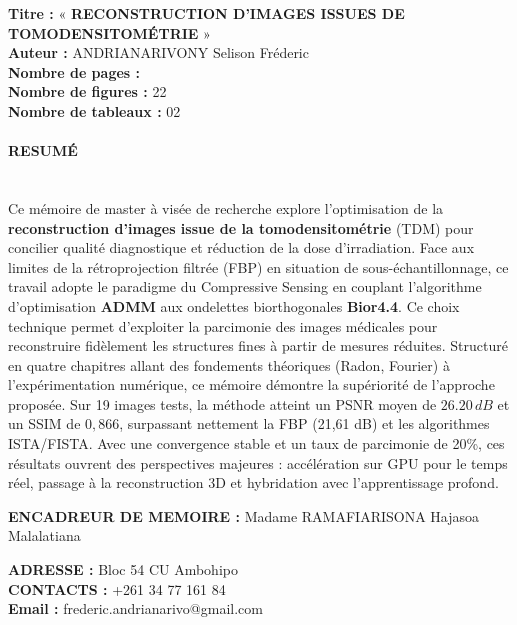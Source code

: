 \noindent
{\Large \textbf{Titre :} « \textbf{RECONSTRUCTION D'IMAGES ISSUES DE TOMODENSITOMÉTRIE} » }\vspace{0.5cm}\\
\textbf{Auteur :} ANDRIANARIVONY Selison Fréderic \\
\textbf{Nombre de pages :} \pageref{LastPage}\\
\textbf{Nombre de figures :} 22 \\
\textbf{Nombre de tableaux :} 02
\vspace{0.5cm}

\noindent
\paragraph{RESUMÉ} \\
Ce mémoire de master à visée de recherche explore l'optimisation de la \textbf{reconstruction d'images issue de la tomodensitométrie} (TDM) pour concilier qualité diagnostique et réduction de la dose d'irradiation. Face aux limites de la rétroprojection filtrée (FBP) en situation de sous-échantillonnage, ce travail adopte le paradigme du Compressive Sensing en couplant l'algorithme d'optimisation \textbf{ADMM} aux ondelettes biorthogonales \textbf{Bior4.4}. Ce choix technique permet d'exploiter la parcimonie des images médicales pour reconstruire fidèlement les structures fines à partir de mesures réduites.
Structuré en quatre chapitres allant des fondements théoriques (Radon, Fourier) à l'expérimentation numérique, ce mémoire démontre la supériorité de l'approche proposée. Sur 19 images tests, la méthode atteint un PSNR moyen de $26.20\,dB$ et un SSIM de $0,866$, surpassant nettement la FBP (21,61 dB) et les algorithmes ISTA/FISTA. Avec une convergence stable et un taux de parcimonie de 20\%, ces résultats ouvrent des perspectives majeures : accélération sur GPU pour le temps réel, passage à la reconstruction 3D et hybridation avec l'apprentissage profond.
\vspace{0.5cm}

\noindent
\textbf{ENCADREUR DE MEMOIRE :} Madame RAMAFIARISONA Hajasoa Malalatiana

\vspace{0.5cm}

\noindent
\textbf{ADRESSE :} Bloc 54 CU Ambohipo \\
\textbf{CONTACTS :} +261 34 77 161 84 \\
\textbf{Email :} frederic.andrianarivo@gmail.com
